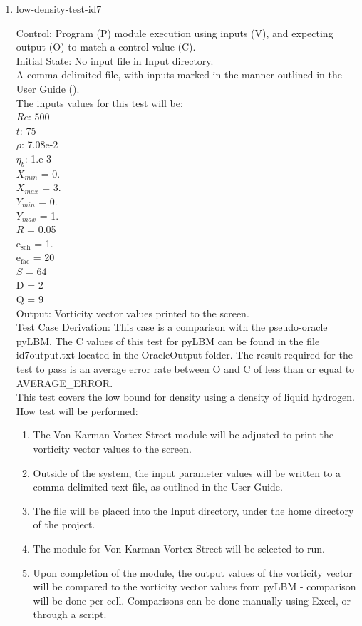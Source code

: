 \documentclass[12pt, titlepage]{article}
\begin{document}
\begin{enumerate}
\item{low-density-test-id7\\}

Control: Program (P) module execution using inputs (V), and expecting output (O) to match a control value (C).\\
					
Initial State: No input file in Input directory.\\
					
A comma delimited file, with inputs marked in the manner outlined in the User Guide (\citet{LBM_UserGuide_PM}).\\The inputs values for this test will be:\\
$Re$: 500\\
$t$: 75\\
$\rho$: 7.08e-2\\
$\eta_b$: 1.e-3\\
$X_{min}$ = 0.\\
$X_{max}$ = 3.\\
$Y_{min}$ = 0.\\
$Y_{max}$ = 1.\\
$R$ = 0.05\\
$\mathrm{e_{sch}}$ = 1.\\
$\mathrm{e_{fac}}$ = 20\\
$S$ = 64\\
$\mathrm{D}$ = 2\\
$\mathrm{Q}$ = 9\\

Output: Vorticity vector values printed to the screen. \\

Test Case Derivation: This case is a comparison with the pseudo-oracle pyLBM. The C values of this test for pyLBM can be found in the file id7output.txt located in the OracleOutput folder. The result required for the test to pass is an average error rate between O and C of less than or equal to AVERAGE\_ERROR.\\
This test covers the low bound for density using a density of liquid hydrogen.\\

					
How test will be performed: 

\begin{enumerate}
\item The Von Karman Vortex Street module will be adjusted to print the vorticity vector values to the screen.
\item Outside of the system, the input parameter values will be written to a comma delimited text file, as outlined in the User Guide.
\item The file will be placed into the Input directory, under the home directory of the project.
\item The module for Von Karman Vortex Street will be selected to run.
\item Upon completion of the module, the output values of the vorticity vector will be compared to the vorticity vector values from pyLBM - comparison will be done per cell. Comparisons can be done manually using Excel, or through a script.\\
\end{enumerate}


\end{enumerate}
\end{document}

